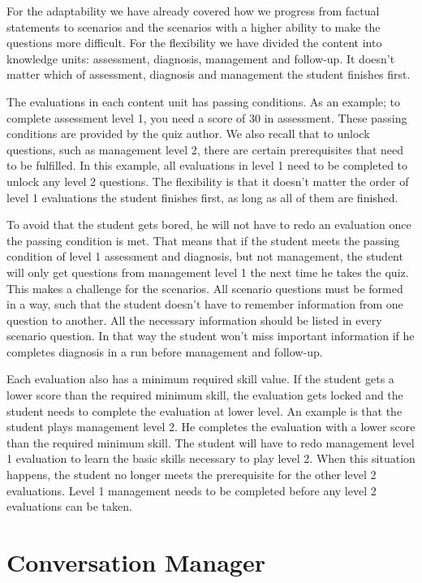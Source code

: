 For the adaptability we have already covered how we progress from factual statements to scenarios and the scenarios with a higher ability to make the questions more difficult. For the flexibility we have divided the content into knowledge units: assessment, diagnosis, management and follow-up. It doesn't matter which of assessment, diagnosis and management the student finishes first.

The evaluations in each content unit has passing conditions. As an example; to complete assessment level 1, you need a score of 30 in assessment. These passing conditions are provided by the quiz author. We also recall that to unlock questions, such as management level 2, there are certain prerequisites that need to be fulfilled. In this example, all evaluations in level 1 need to be completed to unlock any level 2 questions. The flexibility is that it doesn't matter the order of level 1 evaluations the student finishes first, as long as all of them are finished.

To avoid that the student gets bored, he will not have to redo an evaluation once the passing condition is met. That means that if the student meets the passing condition of level 1 assessment and diagnosis, but not management, the student will only get questions from management level 1 the next time he takes the quiz. This makes a challenge for the scenarios. All scenario questions must be formed in a way, such that the student doesn't have to remember information from one question to another. All the necessary information should be listed in every scenario question. In that way the student won't miss important information if he completes diagnosis in a run before management and follow-up. 

Each evaluation also has a minimum required skill value. If the student gets a lower score than the required minimum skill, the evaluation gets locked and the student needs to complete the evaluation at lower level. An example is that the student plays management level 2. He completes the evaluation with a lower score than the required minimum skill. The student will have to redo management level 1 evaluation to learn the basic skills necessary to play level 2. When this situation happens, the student no longer meets the prerequisite for the other level 2 evaluations. Level 1 management needs to be completed before any level 2 evaluations can be taken. 





\section{Conversation Manager}
